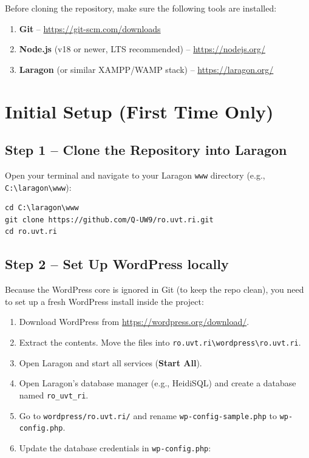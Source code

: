 \documentclass[11pt,a4paper]{article}
\begin{document}
Before cloning the repository, make sure the following tools are installed:

\begin{enumerate}[leftmargin=1.5em]
    \item \textbf{Git} --
          \url{https://git-scm.com/downloads}
    \item \textbf{Node.js} (v18 or newer, LTS recommended) --
          \url{https://nodejs.org/}
    \item \textbf{Laragon} (or similar XAMPP/WAMP stack) --
          \url{https://laragon.org/}
\end{enumerate}

\section{Initial Setup (First Time Only)}

\subsection{Step 1 -- Clone the Repository into Laragon}

Open your terminal and navigate to your Laragon \texttt{www} directory (e.g., \texttt{C:\textbackslash laragon\textbackslash www}):

\begin{lstlisting}
cd C:\laragon\www
git clone https://github.com/Q-UW9/ro.uvt.ri.git
cd ro.uvt.ri
\end{lstlisting}

\subsection{Step 2 -- Set Up WordPress locally}

Because the WordPress core is ignored in Git (to keep the repo clean), you need to set up a fresh WordPress install inside the project:

\begin{enumerate}[leftmargin=1.5em]
    \item Download WordPress from \url{https://wordpress.org/download/}.
    \item Extract the contents. Move the files into \texttt{ro.uvt.ri\textbackslash wordpress\textbackslash ro.uvt.ri}.
    \item Open Laragon and start all services (\textbf{Start All}).
    \item Open Laragon's database manager (e.g., HeidiSQL) and create a database named \texttt{ro\_uvt\_ri}.
    \item Go to \texttt{wordpress/ro.uvt.ri/} and rename \texttt{wp-config-sample.php} to \texttt{wp-config.php}.
    \item Update the database credentials in \texttt{wp-config.php}:
\end{enumerate}
\end{document}
